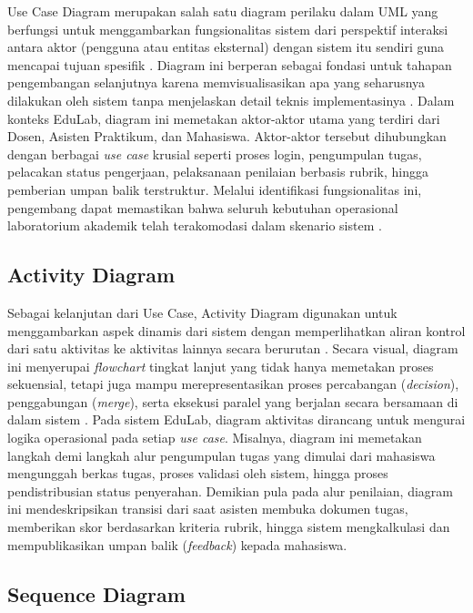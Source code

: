 \documentclass[12pt,a4paper,twoside]{report}
\begin{document}
Use Case Diagram merupakan salah satu diagram perilaku dalam UML yang berfungsi untuk menggambarkan fungsionalitas sistem dari perspektif interaksi antara aktor (pengguna atau entitas eksternal) dengan sistem itu sendiri guna mencapai tujuan spesifik \cite{dennis2015}. Diagram ini berperan sebagai fondasi untuk tahapan pengembangan selanjutnya karena memvisualisasikan apa yang seharusnya dilakukan oleh sistem tanpa menjelaskan detail teknis implementasinya \cite{booch2005}. Dalam konteks EduLab, diagram ini memetakan aktor-aktor utama yang terdiri dari Dosen, Asisten Praktikum, dan Mahasiswa. Aktor-aktor tersebut dihubungkan dengan berbagai \textit{use case} krusial seperti proses login, pengumpulan tugas, pelacakan status pengerjaan, pelaksanaan penilaian berbasis rubrik, hingga pemberian umpan balik terstruktur. Melalui identifikasi fungsionalitas ini, pengembang dapat memastikan bahwa seluruh kebutuhan operasional laboratorium akademik telah terakomodasi dalam skenario sistem \cite{adekunle2024}.

\subsection{Activity Diagram}

Sebagai kelanjutan dari Use Case, Activity Diagram digunakan untuk menggambarkan aspek dinamis dari sistem dengan memperlihatkan aliran kontrol dari satu aktivitas ke aktivitas lainnya secara berurutan \cite{dennis2015}. Secara visual, diagram ini menyerupai \textit{flowchart} tingkat lanjut yang tidak hanya memetakan proses sekuensial, tetapi juga mampu merepresentasikan proses percabangan (\textit{decision}), penggabungan (\textit{merge}), serta eksekusi paralel yang berjalan secara bersamaan di dalam sistem \cite{fowler2004}. Pada sistem EduLab, diagram aktivitas dirancang untuk mengurai logika operasional pada setiap \textit{use case}. Misalnya, diagram ini memetakan langkah demi langkah alur pengumpulan tugas yang dimulai dari mahasiswa mengunggah berkas tugas, proses validasi oleh sistem, hingga proses pendistribusian status penyerahan. Demikian pula pada alur penilaian, diagram ini mendeskripsikan transisi dari saat asisten membuka dokumen tugas, memberikan skor berdasarkan kriteria rubrik, hingga sistem mengkalkulasi dan mempublikasikan umpan balik (\textit{feedback}) kepada mahasiswa.

\subsection{Sequence Diagram}
\end{document}
